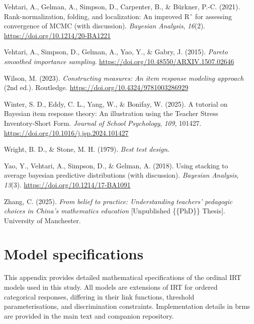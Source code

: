 \documentclass[
  man,
  floatsintext,
  longtable,
  nolmodern,
  notxfonts,
  notimes,
  colorlinks=true,linkcolor=blue,citecolor=blue,urlcolor=blue]{apa7}
\newlength{\cslhangindent}
\newenvironment{CSLReferences}[2] %
 {\begin{list}{}{%
  \setlength{\itemindent}{0pt}
  \setlength{\leftmargin}{0pt}
  \setlength{\parsep}{0pt}
  \ifodd #1
   \setlength{\leftmargin}{\cslhangindent}
   \setlength{\itemindent}{-1\cslhangindent}
  \fi
  \setlength{\itemsep}{#2\baselineskip}}}
 {\end{list}}
\begin{document}
\begin{CSLReferences}{1}{0}
Vehtari, A., Gelman, A., Simpson, D., Carpenter, B., \& Bürkner, P.-C.
(2021). Rank-normalization, folding, and localization: An improved Rˆ
for assessing convergence of {MCMC} (with discussion). \emph{Bayesian
Analysis}, \emph{16}(2). \url{https://doi.org/10.1214/20-BA1221}

Vehtari, A., Simpson, D., Gelman, A., Yao, Y., \& Gabry, J. (2015).
\emph{Pareto smoothed importance sampling}.
\url{https://doi.org/10.48550/ARXIV.1507.02646}

Wilson, M. (2023). \emph{Constructing measures: An item response
modeling approach} (2nd ed.). Routledge.
\url{https://doi.org/10.4324/9781003286929}

Winter, S. D., Eddy, C. L., Yang, W., \& Bonifay, W. (2025). A tutorial
on {Bayesian} item response theory: {An} illustration using the {Teacher
Stress Inventory-Short Form}. \emph{Journal of School Psychology},
\emph{109}, 101427. \url{https://doi.org/10.1016/j.jsp.2024.101427}

Wright, B. D., \& Stone, M. H. (1979). \emph{Best test design}.

Yao, Y., Vehtari, A., Simpson, D., \& Gelman, A. (2018). Using stacking
to average bayesian predictive distributions (with discussion).
\emph{Bayesian Analysis}, \emph{13}(3).
\url{https://doi.org/10.1214/17-BA1091}

Zhang, C. (2025). \emph{From belief to practice: Understanding teachers'
pedagogic choices in {China}'s mathematics education} {[}Unpublished
\{\{PhD\}\} Thesis{]}. University of Manchester.

\end{CSLReferences}

\appendix

\section{Model specifications}\label{apx-models}

This appendix provides detailed mathematical specifications of the
ordinal IRT models used in this study. All models are extensions of IRT
for ordered categorical responses, differing in their link functions,
threshold parameterisations, and discrimination constraints.
Implementation details in brms are provided in the main text and
companion repository.
\end{document}
